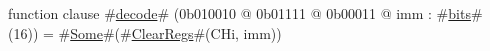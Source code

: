 function clause #\hyperref[sailMIPSzdecode]{decode}# (0b010010 @ 0b01111 @ 0b00011 @ imm : #\hyperref[sailMIPSzbits]{bits}#(16)) = #\hyperref[sailMIPSzSome]{Some}#(#\hyperref[sailMIPSzClearRegs]{ClearRegs}#(CHi,  imm))

